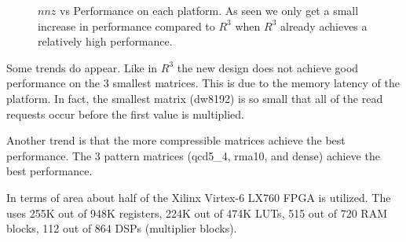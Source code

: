 \begin{figure*}
\caption[SpMV performance on our newest design]{$nnz$ vs Performance on each platform. As seen we only get a small increase in performance compared to $R^3$ when $R^3$ already achieves a relatively high performance.}
\label{fig:newResults}
\end{figure*}

Some trends do appear. Like in $R^3$ the new design does not achieve good performance on the 3 smallest matrices. This is due to the memory latency of the platform. In fact, the smallest matrix (dw8192) is so small that all of the read requests occur before the first value is multiplied.

Another trend is that the more compressible matrices achieve the best performance. The 3 pattern matrices (qcd5\_4, rma10, and dense) achieve the best performance.

In terms of area about half of the Xilinx Virtex-6 LX760 FPGA is utilized. The uses 255K out of 948K registers, 224K out of 474K LUTs, 515 out of 720 RAM blocks, 112 out of 864 DSPs (multiplier blocks).
